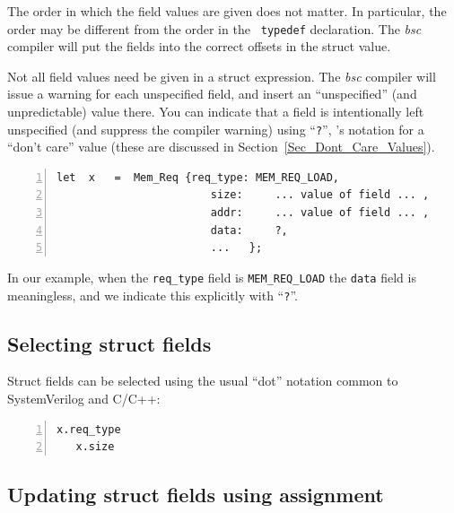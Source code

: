 The order in which the field values are given does not matter.  In
particular, the order may be different from the order in the {\tt
typedef} declaration.  The \emph{bsc} compiler will put the fields
into the correct offsets in the struct value.

Not all field values need be given in a struct expression.  The
\emph{bsc} compiler will issue a warning for each unspecified field,
and insert an ``unspecified'' (and unpredictable) value there.  You
can indicate that a field is intentionally left unspecified (and
suppress the compiler warning) using ``\verb|?|'', {\BSV}'s notation
for a ``don't care'' value (these are discussed in
Section~\ref{Sec_Dont_Care_Values}).

{\footnotesize
\begin{Verbatim}[frame=single, numbers=left]
   let  x   =  Mem_Req {req_type: MEM_REQ_LOAD,
                        size:     ... value of field ... ,
                        addr:     ... value of field ... ,
                        data:     ?,
                        ...   };
\end{Verbatim}
}

In our example, when the \verb|req_type| field is \verb|MEM_REQ_LOAD|
the \verb|data| field is meaningless, and we indicate this explicitly
with ``\verb|?|''.


\subsection{Selecting struct fields}


Struct fields can be selected using the usual ``dot'' notation common
to SystemVerilog and C/C++:

{\footnotesize
\begin{Verbatim}[frame=single, numbers=left]
   x.req_type
   x.size
\end{Verbatim}
}


\subsection{Updating struct fields using assignment}


